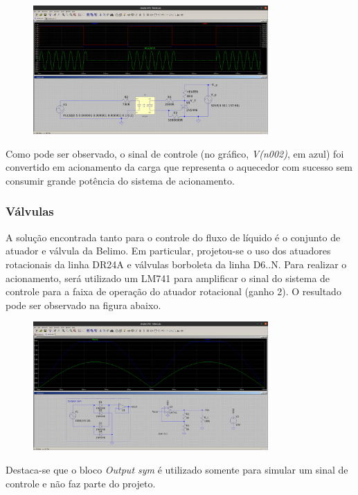 \documentclass[a4paper]{report}
\begin{document}
\begin{figure}[H]
    \centering
    \includegraphics[width=0.8\textwidth]{figures/sym_heater.png}
\end{figure}

Como pode ser observado, o sinal de controle (no gráfico, \emph{V(n002)}, em azul) foi convertido em acionamento da carga que representa o aquecedor com sucesso sem consumir grande potência do sistema de acionamento.

\subsubsection*{Válvulas}

A solução encontrada tanto para o controle do fluxo de líquido é o conjunto de atuador e válvula da Belimo. Em particular, projetou-se o uso dos atuadores rotacionais da linha DR24A e válvulas borboleta da linha D6..N. Para realizar o acionamento, será utilizado um LM741 para amplificar o sinal do sistema de controle para a faixa de operação do atuador rotacional (ganho 2). O resultado pode ser observado na figura abaixo.

\begin{figure}[H]
    \centering
    \includegraphics[width=0.8\textwidth]{figures/sym_valve.png}
\end{figure}

Destaca-se que o bloco \emph{Output sym} é utilizado somente para simular um sinal de controle e não faz parte do projeto.
\end{document}
